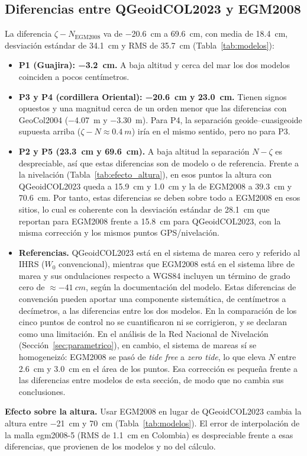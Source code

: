 \documentclass[11pt,letterpaper]{article}
\begin{document}
\subsection{Diferencias entre QGeoidCOL2023 y EGM2008}

La diferencia $\zeta-N_{\text{EGM2008}}$ va de \SI{-20.6}{cm} a \SI{+69.6}{cm}, con media de
\SI{+18.4}{cm}, desviación estándar de \SI{34.1}{cm} y RMS de \SI{35.7}{cm}
(Tabla~\ref{tab:modelos}):
\begin{itemize}
    \item \textbf{P1 (Guajira): \SI{-3.2}{cm}.} A baja altitud y cerca del mar los dos modelos
    coinciden a pocos centímetros.
    \item \textbf{P3 y P4 (cordillera Oriental): \SI{-20.6}{cm} y \SI{+23.0}{cm}.} Tienen signos
    opuestos y una magnitud cerca de un orden menor que las diferencias con GeoCol2004
    (\SI{-4.07}{m} y \SI{-3.30}{m}). Para P4, la
    separación geoide--cuasigeoide supuesta arriba ($\zeta-N\approx\SI{+0.4}{m}$) iría en el mismo
    sentido, pero no para P3.
    \item \textbf{P2 y P5 (\SI{+23.3}{cm} y \SI{+69.6}{cm}).} A baja altitud la separación
    $N-\zeta$ es despreciable, así que estas diferencias son de modelo o de referencia. Frente a la
    nivelación (Tabla~\ref{tab:efecto_altura}), en esos puntos la altura con QGeoidCOL2023 queda a
    \SI{15.9}{cm} y \SI{1.0}{cm} y la de EGM2008 a \SI{39.3}{cm} y \SI{70.6}{cm}. Por tanto, estas diferencias
    se deben sobre todo a EGM2008 en esos sitios, lo cual es coherente con la desviación estándar de
    \SI{28.1}{cm} que \citet{liu2024} reportan para EGM2008 frente a \SI{15.8}{cm} para QGeoidCOL2023, con la
    misma corrección y los mismos puntos GPS/nivelación.
    
    \item \textbf{Referencias.} QGeoidCOL2023 está en el sistema de marea cero y referido al IHRS
    ($W_0$ convencional), mientras que EGM2008 está en el sistema libre de marea y sus ondulaciones
    respecto a WGS84 incluyen un término de grado cero de $\approx\SI{-41}{cm}$, según la documentación
    del modelo. Estas diferencias de convención pueden aportar una componente sistemática, de centímetros
    a decímetros, a las diferencias entre los dos modelos. En la comparación de los cinco puntos de
    control no se cuantificaron ni se corrigieron, y se declaran como una limitación. En el análisis de
    la Red Nacional de Nivelación (Sección~\ref{sec:parametrico}), en cambio, el sistema de mareas sí se
    homogeneizó: EGM2008 se pasó de \emph{tide free} a \emph{zero tide}, lo que eleva $N$ entre
    \SI{2.6}{cm} y \SI{3.0}{cm} en el área de los puntos. Esa corrección es pequeña frente a las diferencias
    entre modelos de esta sección, de modo que no cambia sus conclusiones.
    
\end{itemize}
\noindent\textbf{Efecto sobre la altura.} Usar EGM2008 en lugar de QGeoidCOL2023 cambia la
altura entre \SI{-21}{cm} y \SI{+70}{cm} (Tabla~\ref{tab:modelos}). El error de
interpolación de la malla egm2008-5 (RMS de \SI{1.1}{cm} en Colombia) es despreciable frente
a esas diferencias, que provienen de los modelos y no del cálculo.
\end{document}
